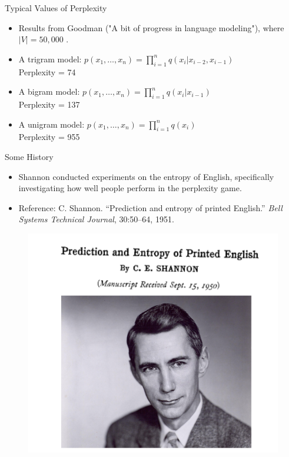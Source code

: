 \documentclass[handout]{beamer}
\begin{document}
\begin{frame}{Typical Values of Perplexity}
    \scriptsize
    \begin{itemize}
        \item Results from Goodman ("A bit of progress in language modeling"), where $|V| = 50,000$ \cite{goodman2001bit}.
        \item A trigram model: $p(x_1, \ldots, x_n) = \prod_{i=1}^n q(x_i | x_{i-2}, x_{i-1})$ \\
        Perplexity = 74
        \item A bigram model: $p(x_1, \ldots, x_n) = \prod_{i=1}^n q(x_i | x_{i-1})$ \\
        Perplexity = 137
        \item A unigram model: $p(x_1, \ldots, x_n) = \prod_{i=1}^n q(x_i)$ \\
        Perplexity = 955
    \end{itemize}
\end{frame}



\begin{frame}{Some History}
    \scriptsize
    \begin{itemize}
        \item Shannon conducted experiments on the entropy of English, specifically investigating how well people perform in the perplexity game.
        \item Reference: C. Shannon. ``Prediction and entropy of printed English.'' \textit{Bell Systems Technical Journal}, 30:50–64, 1951. \cite{shannon1951prediction}
    \end{itemize}
    
    
 \begin{figure}[h]
        	\includegraphics[scale = 0.4]{pics/shannon.png}
        \end{figure}  
    
\end{frame}
\end{document}
